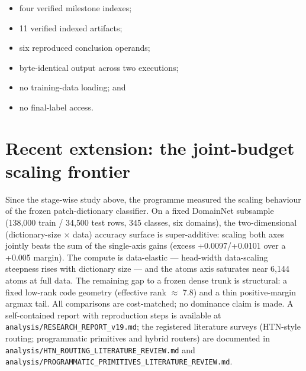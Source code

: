 \documentclass[10pt]{article}
\begin{document}
\begin{itemize}
  \item four verified milestone indexes;
  \item 11 verified indexed artifacts;
  \item six reproduced conclusion operands;
  \item byte-identical output across two executions;
  \item no training-data loading; and
  \item no final-label access.
\end{itemize}

\section{Recent extension: the joint-budget scaling frontier}

Since the stage-wise study above, the programme measured the scaling
behaviour of the frozen patch-dictionary classifier. On a fixed DomainNet
subsample (138{,}000 train / 34{,}500 test rows, 345 classes, six domains),
the two-dimensional (dictionary-size $\times$ data) accuracy surface is
super-additive: scaling both axes jointly beats the sum of the single-axis
gains (excess +0.0097/+0.0101 over a +0.005 margin). The compute is
data-elastic --- head-width data-scaling steepness rises with dictionary
size --- and the atoms axis saturates near 6{,}144 atoms at full data. The
remaining gap to a frozen dense trunk is structural: a fixed low-rank code
geometry (effective rank $\approx$ 7.8) and a thin positive-margin argmax
tail. All comparisons are cost-matched; no dominance claim is made. A
self-contained report with reproduction steps is available at
\texttt{analysis/RESEARCH\_REPORT\_v19.md}; the registered literature
surveys (HTN-style routing; programmatic primitives and hybrid routers) are
documented in \texttt{analysis/HTN\_ROUTING\_LITERATURE\_REVIEW.md} and
\texttt{analysis/PROGRAMMATIC\_PRIMITIVES\_LITERATURE\_REVIEW.md}.
\end{document}
